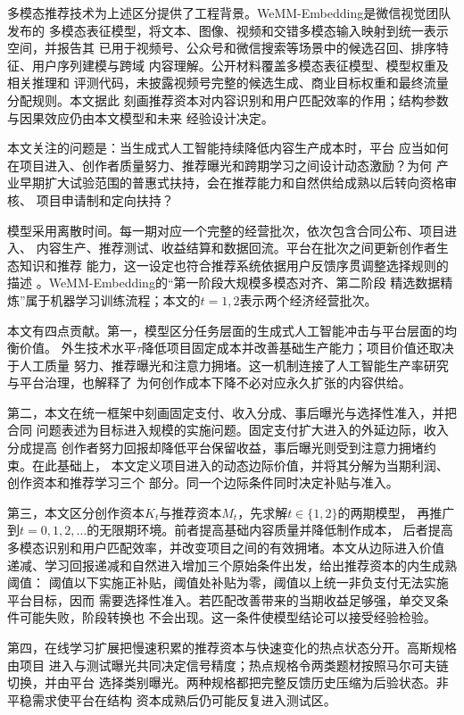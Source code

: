 \documentclass[UTF8, a4paper, 12pt, fontset=fandol]{ctexart}
\theoremstyle{definition}
\theoremstyle{remark}
\begin{document}
多模态推荐技术为上述区分提供了工程背景。WeMM-Embedding是微信视觉团队发布的
多模态表征模型，将文本、图像、视频和交错多模态输入映射到统一表示空间，并报告其
已用于视频号、公众号和微信搜索等场景中的候选召回、排序特征、用户序列建模与跨域
内容理解\citep{zhou2026wemm}。公开材料覆盖多模态表征模型、模型权重及相关推理和
评测代码，未披露视频号完整的候选生成、商业目标权重和最终流量分配规则。本文据此
刻画推荐资本对内容识别和用户匹配效率的作用；结构参数与因果效应仍由本文模型和未来
经验设计决定。

本文关注的问题是：当生成式人工智能持续降低内容生产成本时，平台
应当如何在项目进入、创作者质量努力、推荐曝光和跨期学习之间设计动态激励？为何
产业早期扩大试验范围的普惠式扶持，会在推荐能力和自然供给成熟以后转向资格审核、
项目申请制和定向扶持？

模型采用离散时间。每一期对应一个完整的经营批次，依次包含合同公布、项目进入、
内容生产、推荐测试、收益结算和数据回流。平台在批次之间更新创作者生态知识和推荐
能力，这一设定也符合推荐系统依据用户反馈序贯调整选择规则的描述
\citep{li2010contextual}。WeMM-Embedding的“第一阶段大规模多模态对齐、第二阶段
精选数据精炼”属于机器学习训练流程；本文的$t=1,2$表示两个经济经营批次。

本文有四点贡献。第一，模型区分任务层面的生成式人工智能冲击与平台层面的均衡价值。
外生技术水平$\tau$降低项目固定成本并改善基础生产能力；项目价值还取决于人工质量
努力、推荐曝光和注意力拥堵。这一机制连接了人工智能生产率研究与平台治理，也解释了
为何创作成本下降不必对应永久扩张的内容供给。

第二，本文在统一框架中刻画固定支付、收入分成、事后曝光与选择性准入，并把合同
问题表述为目标进入规模的实施问题。固定支付扩大进入的外延边际，收入分成提高
创作者努力回报却降低平台保留收益，事后曝光则受到注意力拥堵约束。在此基础上，
本文定义项目进入的动态边际价值，并将其分解为当期利润、创作资本和推荐学习三个
部分。同一个边际条件同时决定补贴与准入。

第三，本文区分创作资本$K_t$与推荐资本$M_t$，先求解$t\in\{1,2\}$的两期模型，
再推广到$t=0,1,2,\ldots$的无限期环境。前者提高基础内容质量并降低制作成本，
后者提高多模态识别和用户匹配效率，并改变项目之间的有效拥堵。本文从边际进入价值
递减、学习回报递减和自然进入增加三个原始条件出发，给出推荐资本的内生成熟阈值：
阈值以下实施正补贴，阈值处补贴为零，阈值以上统一非负支付无法实施平台目标，因而
需要选择性准入。若匹配改善带来的当期收益足够强，单交叉条件可能失败，阶段转换也
不会出现。这一条件使模型结论可以接受经验检验。

第四，在线学习扩展把慢速积累的推荐资本与快速变化的热点状态分开。高斯规格由项目
进入与测试曝光共同决定信号精度；热点规格令两类题材按照马尔可夫链切换，并由平台
选择类别曝光。两种规格都把完整反馈历史压缩为后验状态。非平稳需求使平台在结构
资本成熟后仍可能反复进入测试区。
\end{document}
